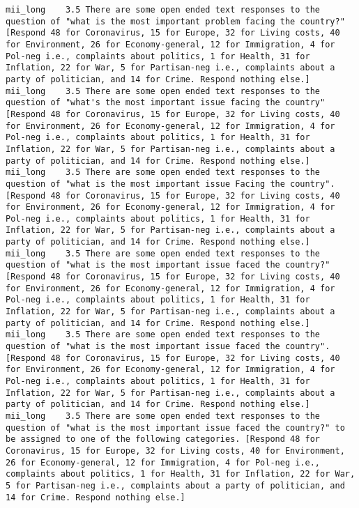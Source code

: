 \begin{lstlisting}[label=lst:promptvariants]
mii_long	3.5	There are some open ended text responses to the question of "what is the most important problem facing the country?" [Respond 48 for Coronavirus, 15 for Europe, 32 for Living costs, 40 for Environment, 26 for Economy-general, 12 for Immigration, 4 for Pol-neg i.e., complaints about politics, 1 for Health, 31 for Inflation, 22 for War, 5 for Partisan-neg i.e., complaints about a party of politician, and 14 for Crime. Respond nothing else.]
mii_long	3.5	There are some open ended text responses to the question of "what's the most important issue facing the country" [Respond 48 for Coronavirus, 15 for Europe, 32 for Living costs, 40 for Environment, 26 for Economy-general, 12 for Immigration, 4 for Pol-neg i.e., complaints about politics, 1 for Health, 31 for Inflation, 22 for War, 5 for Partisan-neg i.e., complaints about a party of politician, and 14 for Crime. Respond nothing else.]
mii_long	3.5	There are some open ended text responses to the question of "what is the most important issue Facing the country". [Respond 48 for Coronavirus, 15 for Europe, 32 for Living costs, 40 for Environment, 26 for Economy-general, 12 for Immigration, 4 for Pol-neg i.e., complaints about politics, 1 for Health, 31 for Inflation, 22 for War, 5 for Partisan-neg i.e., complaints about a party of politician, and 14 for Crime. Respond nothing else.]
mii_long	3.5	There are some open ended text responses to the question of "what is the most important issue faced the country?" [Respond 48 for Coronavirus, 15 for Europe, 32 for Living costs, 40 for Environment, 26 for Economy-general, 12 for Immigration, 4 for Pol-neg i.e., complaints about politics, 1 for Health, 31 for Inflation, 22 for War, 5 for Partisan-neg i.e., complaints about a party of politician, and 14 for Crime. Respond nothing else.]
mii_long	3.5	There are some open ended text responses to the question of "what is the most important issue faced the country". [Respond 48 for Coronavirus, 15 for Europe, 32 for Living costs, 40 for Environment, 26 for Economy-general, 12 for Immigration, 4 for Pol-neg i.e., complaints about politics, 1 for Health, 31 for Inflation, 22 for War, 5 for Partisan-neg i.e., complaints about a party of politician, and 14 for Crime. Respond nothing else.]
mii_long	3.5	There are some open ended text responses to the question of "what is the most important issue faced the country?" to be assigned to one of the following categories. [Respond 48 for Coronavirus, 15 for Europe, 32 for Living costs, 40 for Environment, 26 for Economy-general, 12 for Immigration, 4 for Pol-neg i.e., complaints about politics, 1 for Health, 31 for Inflation, 22 for War, 5 for Partisan-neg i.e., complaints about a party of politician, and 14 for Crime. Respond nothing else.]

\end{lstlisting}
